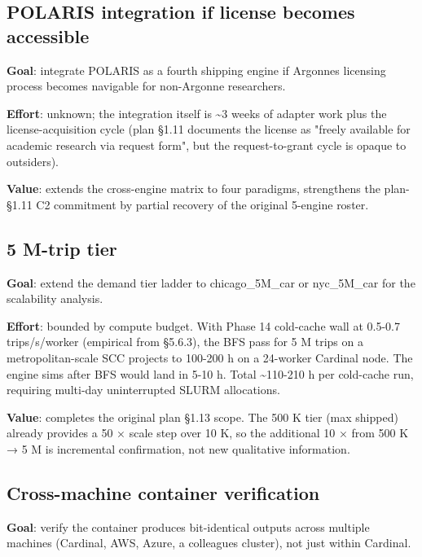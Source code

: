 \subsection{POLARIS integration if license becomes
accessible}\label{654-polaris-integration-if-license-becomes-accessible}

\textbf{Goal}: integrate POLARIS as a fourth shipping engine if
Argonne\textquotesingle s licensing process becomes navigable for
non-Argonne researchers.

\textbf{Effort}: unknown; the integration itself is \textasciitilde3
weeks of adapter work plus the license-acquisition cycle (plan §1.11
documents the license as "freely available for academic research via
request form", but the request-to-grant cycle is opaque to outsiders).

\textbf{Value}: extends the cross-engine matrix to four paradigms,
strengthens the plan-§1.11 C2 commitment by partial recovery of the
original 5-engine roster.

\subsection{5 M-trip tier}\label{655-5-m-trip-tier}

\textbf{Goal}: extend the demand tier ladder to chicago\_5M\_car or
nyc\_5M\_car for the scalability analysis.

\textbf{Effort}: bounded by compute budget. With Phase 14 cold-cache
wall at 0.5-0.7 trips/s/worker (empirical from §5.6.3), the BFS pass for
5 M trips on a metropolitan-scale SCC projects to 100-200 h on a
24-worker Cardinal node. The engine sims after BFS would land in 5-10 h.
Total \textasciitilde110-210 h per cold-cache run, requiring multi-day
uninterrupted SLURM allocations.

\textbf{Value}: completes the original plan §1.13 scope. The 500 K
tier (max shipped) already provides a 50 × scale step over 10 K, so the
additional 10 × from 500 K → 5 M is incremental confirmation, not new
qualitative information.

\subsection{Cross-machine container
verification}\label{656-cross-machine-container-verification}

\textbf{Goal}: verify the container produces bit-identical outputs
across multiple machines (Cardinal, AWS, Azure, a
colleague\textquotesingle s cluster), not just within Cardinal.


